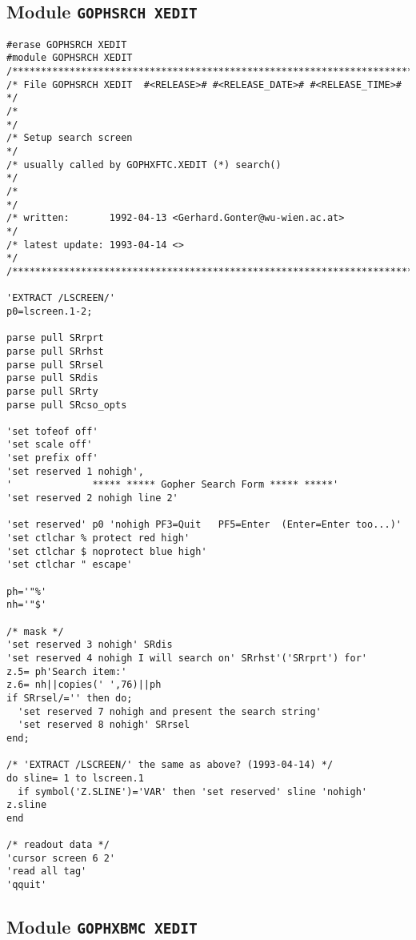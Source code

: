 \subsection{Module {\tt GOPHSRCH XEDIT}}

\def\LPtopD{Module {\tt GOPHSRCH XEDIT}}

\def\LPtopF{~}

\begin{verbatim}
#erase GOPHSRCH XEDIT
#module GOPHSRCH XEDIT
/***********************************************************************/
/* File GOPHSRCH XEDIT  #<RELEASE># #<RELEASE_DATE># #<RELEASE_TIME># */
/*                                                                     */
/* Setup search screen                                                 */
/* usually called by GOPHXFTC.XEDIT (*) search()                       */
/*                                                                     */
/* written:       1992-04-13 <Gerhard.Gonter@wu-wien.ac.at>            */
/* latest update: 1993-04-14 <>                                        */
/***********************************************************************/

'EXTRACT /LSCREEN/'
p0=lscreen.1-2;

parse pull SRrprt
parse pull SRrhst
parse pull SRrsel
parse pull SRdis
parse pull SRrty
parse pull SRcso_opts

'set tofeof off'
'set scale off'
'set prefix off'
'set reserved 1 nohigh',
'              ***** ***** Gopher Search Form ***** *****'
'set reserved 2 nohigh line 2'

'set reserved' p0 'nohigh PF3=Quit   PF5=Enter  (Enter=Enter too...)'
'set ctlchar % protect red high'
'set ctlchar $ noprotect blue high'
'set ctlchar " escape'

ph='"%'
nh='"$'

/* mask */
'set reserved 3 nohigh' SRdis
'set reserved 4 nohigh I will search on' SRrhst'('SRrprt') for'
z.5= ph'Search item:'
z.6= nh||copies(' ',76)||ph
if SRrsel/='' then do;
  'set reserved 7 nohigh and present the search string'
  'set reserved 8 nohigh' SRrsel
end;

/* 'EXTRACT /LSCREEN/' the same as above? (1993-04-14) */
do sline= 1 to lscreen.1
  if symbol('Z.SLINE')='VAR' then 'set reserved' sline 'nohigh' z.sline
end

/* readout data */
'cursor screen 6 2'
'read all tag'
'qquit'
\end{verbatim}

\subsection{Module {\tt GOPHXBMC XEDIT}}

